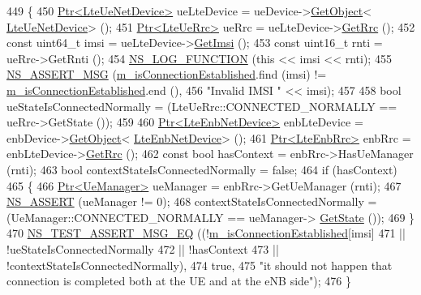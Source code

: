\begin{DoxyCode}
449 \{
450   \hyperlink{classns3_1_1Ptr}{Ptr<LteUeNetDevice>} ueLteDevice = ueDevice->\hyperlink{classns3_1_1Object_a13e18c00017096c8381eb651d5bd0783}{GetObject}<
      \hyperlink{classns3_1_1LteUeNetDevice}{LteUeNetDevice}> ();
451   \hyperlink{classns3_1_1Ptr}{Ptr<LteUeRrc>} ueRrc = ueLteDevice->\hyperlink{classns3_1_1LteUeNetDevice_a1f84e8e99aeb10f4242bbfc7b57a8128}{GetRrc} ();
452   \textcolor{keyword}{const} uint64\_t imsi = ueLteDevice->\hyperlink{classns3_1_1LteUeNetDevice_a673405bfed4b45c5714f17b0c3bad334}{GetImsi} ();
453   \textcolor{keyword}{const} uint16\_t rnti = ueRrc->GetRnti ();
454   \hyperlink{log-macros-disabled_8h_a90b90d5bad1f39cb1b64923ea94c0761}{NS\_LOG\_FUNCTION} (\textcolor{keyword}{this} << imsi << rnti);
455   \hyperlink{assert_8h_aff5ece9066c74e681e74999856f08539}{NS\_ASSERT\_MSG} (\hyperlink{classLteRrcConnectionEstablishmentTestCase_a1516a2a155242462521febbc223b6cfb}{m\_isConnectionEstablished}.find (imsi) != 
      \hyperlink{classLteRrcConnectionEstablishmentTestCase_a1516a2a155242462521febbc223b6cfb}{m\_isConnectionEstablished}.end (),
456                  \textcolor{stringliteral}{"Invalid IMSI "} << imsi);
457 
458   \textcolor{keywordtype}{bool} ueStateIsConnectedNormally = (LteUeRrc::CONNECTED\_NORMALLY == ueRrc->GetState ());
459 
460   \hyperlink{classns3_1_1Ptr}{Ptr<LteEnbNetDevice>} enbLteDevice = enbDevice->\hyperlink{classns3_1_1Object_a13e18c00017096c8381eb651d5bd0783}{GetObject}<
      \hyperlink{classns3_1_1LteEnbNetDevice}{LteEnbNetDevice}> ();
461   \hyperlink{classns3_1_1Ptr}{Ptr<LteEnbRrc>} enbRrc = enbLteDevice->\hyperlink{classns3_1_1LteEnbNetDevice_a161931b1a274572b864fc13784789b98}{GetRrc} ();
462   \textcolor{keyword}{const} \textcolor{keywordtype}{bool} hasContext = enbRrc->HasUeManager (rnti);
463   \textcolor{keywordtype}{bool} contextStateIsConnectedNormally = \textcolor{keyword}{false};
464   \textcolor{keywordflow}{if} (hasContext)
465     \{
466       \hyperlink{classns3_1_1Ptr}{Ptr<UeManager>} ueManager = enbRrc->GetUeManager (rnti);
467       \hyperlink{assert_8h_a6dccdb0de9b252f60088ce281c49d052}{NS\_ASSERT} (ueManager != 0);
468       contextStateIsConnectedNormally = (UeManager::CONNECTED\_NORMALLY == ueManager->
      \hyperlink{classns3_1_1UeManager_a401868bb61523c594c69024e2231467a}{GetState} ());
469     \}
470   \hyperlink{group__testing_ga2a9d78cffb3db8e867c35fff0b698cf5}{NS\_TEST\_ASSERT\_MSG\_EQ} ((!\hyperlink{classLteRrcConnectionEstablishmentTestCase_a1516a2a155242462521febbc223b6cfb}{m\_isConnectionEstablished}[imsi]
471                           || !ueStateIsConnectedNormally
472                           || !hasContext
473                           || !contextStateIsConnectedNormally),
474                          \textcolor{keyword}{true},
475                          \textcolor{stringliteral}{"it should not happen that connection is completed both at the UE and at the eNB
       side"});
476 \}
\end{DoxyCode}


